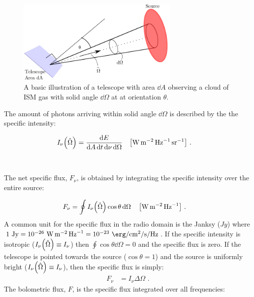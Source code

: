 \begin{figure}
	\centering
	\includegraphics[width=0.7\textwidth]{06_Interstellar_Medium/Images/Theory/intensity.pdf}
	\caption{A basic illustration of a telescope with area $\dd{A}$ observing a cloud of ISM gas with solid angle $\dd{\Omega}$ at at orientation $\theta$.}
	\label{fig:telescope_basic_diagram2}
\end{figure}
\noindent The amount of photons arriving within solid angle $\dd{\Omega}$ is described by the the specific intensity:

\begin{equation}
	\begin{aligned}
		I_\nu\qty(\hat{\Omega})&=\frac{\dd{E}}{\dd{A}\dd{t}\dd{\nu}\dd{\Omega}}\quad\qty[\si{\watt\per\meter\squared\per\hertz\per\steradian}]\text{ .}
	\end{aligned}
\end{equation}
\par~\par 
\noindent The net specific flux, $F_\nu$, is obtained by integrating the specific intensity over the entire source:

\begin{equation}
	\begin{aligned}
		F_\nu &=\oint I_\nu\qty(\hat{\Omega})\cos\theta\dd{\Omega}\quad\qty[\si{\watt\per\meter\squared\per\hertz}]\text{ .}
	\end{aligned}
\end{equation}
\noindent A common unit for the specific flux in the radio domain is the Janksy ($\si{Jy}$) where $1~\si{Jy}=10^{-26}~\si{\watt\per\meter\squared\per\hertz} = 10^{-23}~\si{\erg\per\centi\meter\squared\per\second\per\hertz}$. If the specific intensity is isotropic ($I_\nu\qty(\hat{\Omega})\equiv I_\nu$) then $\oint \cos\theta\dd{\Omega}=0$ and the specific flux is zero. If the telescope is pointed towards the source ($\cos\theta=1$) and the source is uniformly bright ($I_\nu\qty(\hat{\Omega})\equiv I_\nu$), then the specific flux is simply:
\begin{equation}
	\begin{aligned}
		F_\nu&=I_\nu\Delta\Omega\text{ .}
	\end{aligned}\label{eq:specifc_flux_uniform_source}
\end{equation}
\noindent The bolometric flux, $F$, is the specific flux integrated over all frequencies:

